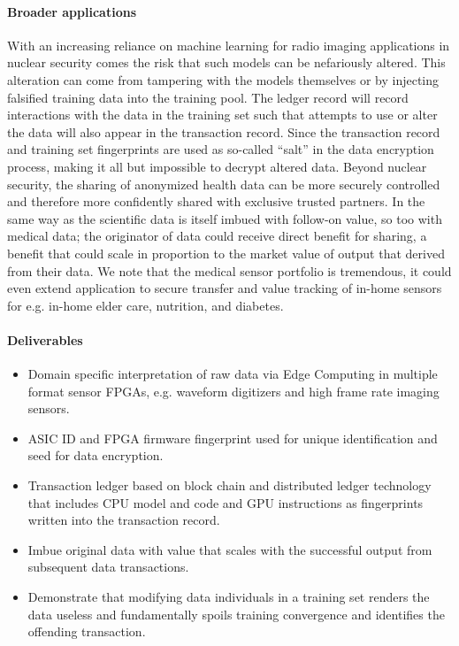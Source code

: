 \documentclass{article}
\begin{document}
\paragraph{Broader applications}
With an increasing reliance on machine learning for radio imaging applications in nuclear security comes the risk that such models can be nefariously altered.
This alteration can come from tampering with the models themselves or by injecting falsified training data into the training pool.
The ledger record will record interactions with the data in the training set such that attempts to use or alter the data will also appear in the transaction record.
Since the transaction record and training set fingerprints are used as so-called ``salt'' in the data encryption process, making it all but impossible to decrypt altered data.
Beyond nuclear security, the sharing of anonymized health data can be more securely controlled and therefore more confidently shared with exclusive trusted partners.
In the same way as the scientific data is itself imbued with follow-on value, so too with medical data; the originator of data could receive direct benefit for sharing, a benefit that could scale in proportion to the market value of output that derived from their data.
We note that the medical sensor portfolio is tremendous, it could even extend application to secure transfer and value tracking of in-home sensors for e.g. in-home elder care, nutrition, and diabetes.

\paragraph{Deliverables}
\begin{itemize}
	\item Domain specific interpretation of raw data via Edge Computing in multiple format sensor FPGAs, e.g. waveform digitizers and high frame rate imaging sensors.
	\item ASIC ID and FPGA firmware fingerprint used for unique identification and seed for data encryption.
	\item Transaction ledger based on block chain and distributed ledger technology that includes CPU model and code and GPU instructions as fingerprints written into the transaction record.
	\item Imbue original data with value that scales with the successful output from subsequent data transactions.
	\item Demonstrate that modifying data individuals in a training set renders the data useless and fundamentally spoils training convergence and identifies the offending transaction.
\end{itemize}



\break
\end{document}
